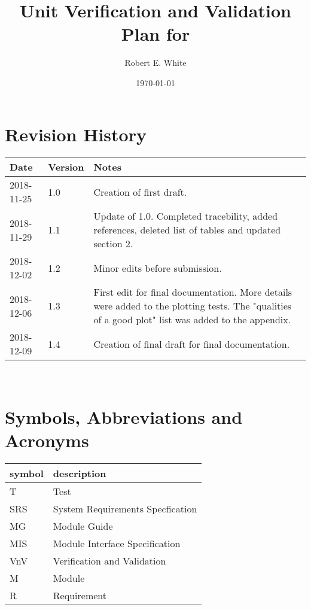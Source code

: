 \documentclass[12pt, titlepage]{article}
\begin{document}
\title{Unit Verification and Validation Plan for \progname{}} 
\author{Robert E. White}
\date{\today}
	
\maketitle


\section{Revision History}

\begin{tabularx}{\textwidth}{p{3cm}p{2cm}X}
\toprule {\bf Date} & {\bf Version} & {\bf Notes}\\
\midrule
2018-11-25 & 1.0 & Creation of first draft.\\
2018-11-29 & 1.1 & Update of 1.0. Completed tracebility, added references, 
deleted list of tables and updated section 2. \\ 
2018-12-02 & 1.2& Minor edits before submission. \\ 
2018-12-06 & 1.3& First edit for final documentation. More details were added 
to the plotting tests. The "qualities of a good plot" list was added to the 
appendix. \\ 
2018-12-09 & 1.4& Creation of final draft for final documentation. \\
\bottomrule
\end{tabularx}

~\newpage

\tableofcontents

\listoftables


\listoffigures


\newpage

\section{Symbols, Abbreviations and Acronyms}

\renewcommand{\arraystretch}{1.2}
\begin{tabular}{l l} 
  \toprule		
  \textbf{symbol} & \textbf{description}\\
  \midrule 
  T & Test\\ 
  SRS & System Requirements Specfication\\ 
  MG & Module Guide\\ 
  MIS & Module Interface Specification\\ 
  VnV & Verification and Validation\\ 
  M & Module\\ 
  R & Requirement\\
  \bottomrule
\end{tabular}\\
\end{document}
